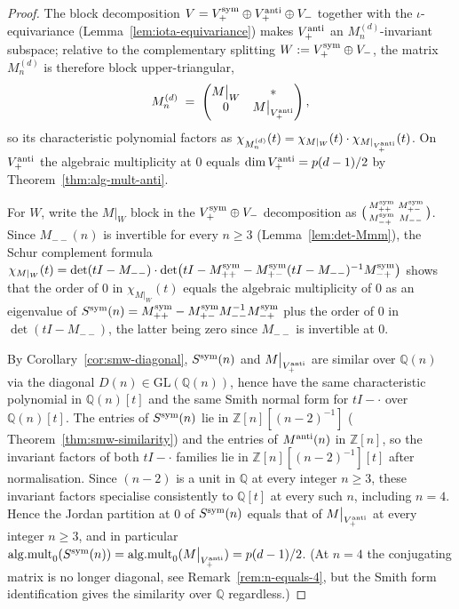 \documentclass{amsart}
\theoremstyle{definition}
\theoremstyle{remark}
\begin{document}
\begin{proof}
The block decomposition $V = V_+^{\rm sym} \oplus V_+^{\rm anti}
\oplus V_-$ together with the $\iota$-equivariance
(Lemma~\ref{lem:iota-equivariance}) makes $V_+^{\rm anti}$ an
$M_n^{(d)}$-invariant subspace; relative to the complementary
splitting $W := V_+^{\rm sym} \oplus V_-$, the matrix
$M_n^{(d)}$ is therefore block upper-triangular,
\[
  M_n^{(d)}
  \;=\;
  \begin{pmatrix}
    M\big|_W & {*} \\
    0 & M\big|_{V_+^{\rm anti}}
  \end{pmatrix},
\]
so its characteristic polynomial factors as
$\chi_{M_n^{(d)}}(t) = \chi_{M|_W}(t) \cdot \chi_{M|_{V_+^{\rm anti}}}(t)$.
On $V_+^{\rm anti}$ the algebraic multiplicity at $0$ equals
$\dim V_+^{\rm anti} = p(d-1)/2$ by
Theorem~\ref{thm:alg-mult-anti}.

For $W$, write the $M\big|_W$ block in the
$V_+^{\rm sym} \oplus V_-$ decomposition as
$\bigl(\begin{smallmatrix} M_{++}^{\rm sym}
   & M_{+-}^{\rm sym} \\ M_{-+}^{\rm sym} & M_{--}
\end{smallmatrix}\bigr)$.
Since $M_{--}(n)$ is invertible for every $n \ge 3$
(Lemma~\ref{lem:det-Mmm}), the Schur complement formula
$\chi_{M|_W}(t) = \det(tI - M_{--}) \cdot
\det\bigl(tI - M_{++}^{\rm sym}
        - M_{+-}^{\rm sym}(tI - M_{--})^{-1} M_{-+}^{\rm sym}\bigr)$
shows that the order of $0$ in $\chi_{M|_W}(t)$ equals
the algebraic multiplicity of $0$ as an eigenvalue of
$S^{\rm sym}(n) = M_{++}^{\rm sym}
  - M_{+-}^{\rm sym} M_{--}^{-1} M_{-+}^{\rm sym}$
plus the order of $0$ in $\det(tI - M_{--})$, the latter
being zero since $M_{--}$ is invertible at $0$.

By Corollary~\ref{cor:smw-diagonal}, $S^{\rm sym}(n)$ and
$M\big|_{V_+^{\rm anti}}$ are similar over $\mathbb Q(n)$ via
the diagonal $D(n) \in \mathrm{GL}(\mathbb Q(n))$, hence have
the same characteristic polynomial in $\mathbb Q(n)[t]$ and the
same Smith normal form for $tI - {\cdot}$ over $\mathbb Q(n)[t]$.
The entries of $S^{\rm sym}(n)$ lie in
$\mathbb Z[n][(n-2)^{-1}]$ \textup{(}
Theorem~\ref{thm:smw-similarity}\textup{)} and the entries of
$M^{\rm anti}(n)$ in $\mathbb Z[n]$, so the invariant factors
of both $tI - {\cdot}$ families lie in
$\mathbb Z[n][(n-2)^{-1}][t]$ after normalisation.  Since
$(n-2)$ is a unit in $\mathbb Q$ at every integer $n \ge 3$,
these invariant factors specialise consistently to
$\mathbb Q[t]$ at every such $n$, including $n = 4$.  Hence the
Jordan partition at $0$ of $S^{\rm sym}(n)$ equals that of
$M\big|_{V_+^{\rm anti}}$ at every integer $n \ge 3$, and in
particular
$\mathrm{alg.mult}_0(S^{\rm sym}(n))
 = \mathrm{alg.mult}_0(M\big|_{V_+^{\rm anti}}) = p(d-1)/2$.
\textup{(}At $n = 4$ the conjugating matrix is no longer
diagonal, see Remark~\ref{rem:n-equals-4}, but the Smith form
identification gives the similarity over $\mathbb Q$
regardless.\textup{)}


\end{proof}
\end{document}
